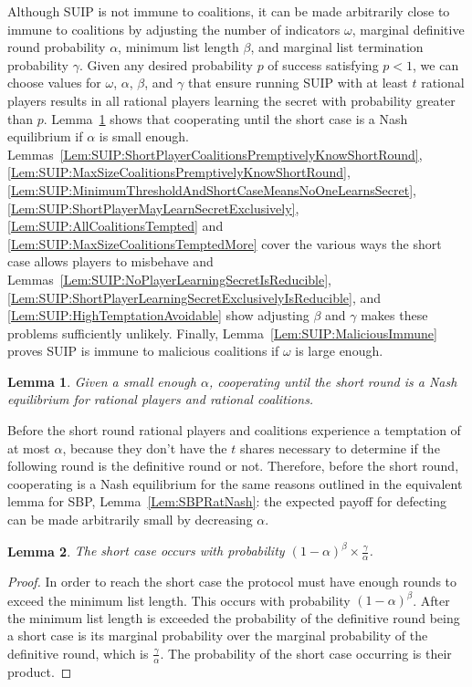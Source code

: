 \documentclass[12pt]{dalcsthesis}
\newtheorem{lemma}{Lemma}
\begin{document}
Although SUIP is not immune to coalitions, it can be made arbitrarily close to immune to coalitions by adjusting the number of indicators $\omega$, marginal definitive round probability $\alpha$, minimum list length $\beta$, and marginal list termination probability $\gamma$. Given any desired probability $p$ of success satisfying $p < 1$, we can choose values for $\omega$, $\alpha$, $\beta$, and $\gamma$ that ensure running SUIP with at least $t$ rational players results in all rational players learning the secret with probability greater than $p$. Lemma~\ref{Lem:SUIP:RatNashCoop} shows that cooperating until the short case is a Nash equilibrium if $\alpha$ is small enough. Lemmas~\ref{Lem:SUIP:ShortPlayerCoalitionsPremptivelyKnowShortRound}, \ref{Lem:SUIP:MaxSizeCoalitionsPremptivelyKnowShortRound}, \ref{Lem:SUIP:MinimumThresholdAndShortCaseMeansNoOneLearnsSecret}, \ref{Lem:SUIP:ShortPlayerMayLearnSecretExclusively}, \ref{Lem:SUIP:AllCoalitionsTempted} and \ref{Lem:SUIP:MaxSizeCoalitionsTemptedMore} cover the various ways the short case allows players to misbehave and Lemmas~\ref{Lem:SUIP:NoPlayerLearningSecretIsReducible}, \ref{Lem:SUIP:ShortPlayerLearningSecretExclusivelyIsReducible}, and \ref{Lem:SUIP:HighTemptationAvoidable} show adjusting $\beta$ and $\gamma$ makes these problems sufficiently unlikely. Finally, Lemma~\ref{Lem:SUIP:MaliciousImmune} proves SUIP is immune to malicious coalitions if $\omega$ is large enough.

\begin{lemma}\label{Lem:SUIP:RatNashCoop}Given a small enough $\alpha$, cooperating until the short round is a Nash equilibrium for rational players and rational coalitions.\end{lemma}

Before the short round rational players and coalitions experience a temptation of at most $\alpha$, because they don't have the $t$ shares necessary to determine if the following round is the definitive round or not. Therefore, before the short round, cooperating is a Nash equilibrium for the same reasons outlined in the equivalent lemma for SBP, Lemma~\ref{Lem:SBPRatNash}: the expected payoff for defecting can be made arbitrarily small by decreasing $\alpha$.

\begin{lemma}\label{Lem:SUIP:ChanceOfShortCase}The short case occurs with probability $(1-\alpha)^\beta \times \frac{\gamma}{\alpha}$.\end{lemma}
\begin{proof}
In order to reach the short case the protocol must have enough rounds to exceed the minimum list length. This occurs with probability $(1-\alpha)^\beta$. After the minimum list length is exceeded the probability of the definitive round being a short case is its marginal probability over the marginal probability of the definitive round, which is $\frac{\gamma}{\alpha}$. The probability of the short case occurring is their product.
\end{proof}
\end{document}
